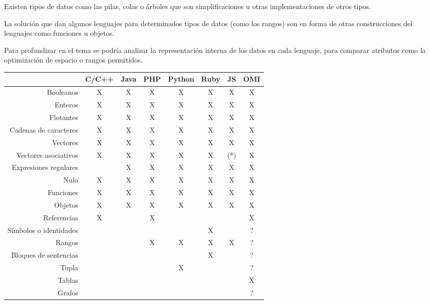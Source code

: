 Existen tipos de datos como las pilas, colas o árboles que son simplificaciones u otras 
implementaciones de otros tipos.

La solución que dan algunos lenguajes para determinados tipos de datos (como los rangos) son en forma 
de otras construcciones del lenguajes como funciones u objetos.

Para profundizar en el tema se podría analizar la representación interna de los
datos en cada lenguaje, para comparar atributos como la optimización de espacio o rangos permitidos. 

 \FloatBarrier
\begin{table}[h]
 \begin{center}
\begin{tabular}{|r|c|c|c|c|c|c|c|} \hline
 & C/C++ & Java & PHP  & Python & Ruby & JS & OMI \\ \hline
Booleanos & X & X & X & X & X & X & X \\ \hline
Enteros & X & X& X & X & X & X & X \\ \hline
Flotantes & X & X & X & X & X & X & X \\ \hline
Cadenas de caracteres & X & X & X & X & X & X & X \\ \hline
Vectores  & X & X & X & X & X & X & X \\ \hline
Vectores asociativos & X & X & X & X & X & (*) & X \\ \hline 
Expresiones regulares &  & X & X & X & X & X & X \\ \hline
Nulo & X & X & X & X & X & X & X \\ \hline
Funciones & X & X & X & X & X & X & X \\ \hline
Objetos & X & X & X & X & X & X & X \\ \hline
Referencias & X & & X & & & & X \\ \hline
Símbolos o identidades & & & & & X &  & ? \\ \hline
Rangos  & & & X & X & X & X & ? \\ \hline
Bloques de sentencias & & & & & X & & ? \\ \hline 
Tupla  & & & & X & & & ? \\ \hline
Tablas &  &  &  &  &  &  & X \\ \hline
Grafos &  &  &  &  &  &  & ? \\ \hline
\end{tabular}

\end{center}
\end{table}
\FloatBarrier

